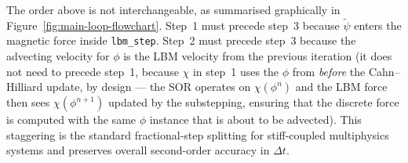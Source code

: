 The order above is not interchangeable, as summarised graphically in Figure~\ref{fig:main-loop-flowchart}.
Step~1 must precede step~3 because $\tilde{\psi}$ enters the magnetic force inside \texttt{lbm\_step}.
Step~2 must precede step~3 because the advecting velocity for $\phi$ is the LBM velocity from the previous iteration (it does not need to precede step~1, because $\chi$ in step~1 uses the $\phi$ from \emph{before} the Cahn--Hilliard update, by design --- the SOR operates on $\chi(\phi^n)$ and the LBM force then sees $\chi(\phi^{n+1})$ updated by the substepping, ensuring that the discrete force is computed with the same $\phi$ instance that is about to be advected).
This staggering is the standard fractional-step splitting for stiff-coupled multiphysics systems and preserves overall second-order accuracy in $\Delta t$.


